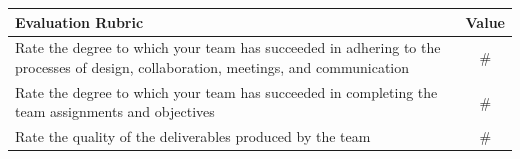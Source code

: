\documentclass[12pt,a4paper]{article}
\begin{document}
\begin{table}[htbp]
\footnotesize
\centering
\begin{tabulary}{\linewidth}{|L|c|}
\hline
{}Evaluation Rubric & Value \\
\hline
Rate the degree to which your team has succeeded in adhering to the processes of design, collaboration, meetings, and communication & \# \\ %
\hline
Rate the degree to which your team has succeeded in completing the
team assignments and objectives & \# \\ %
\hline
Rate the quality of the deliverables produced by the team & \# \\ %
\hline
\end{tabulary}
\label{tab:team1}
\end{table}%
\end{document}
